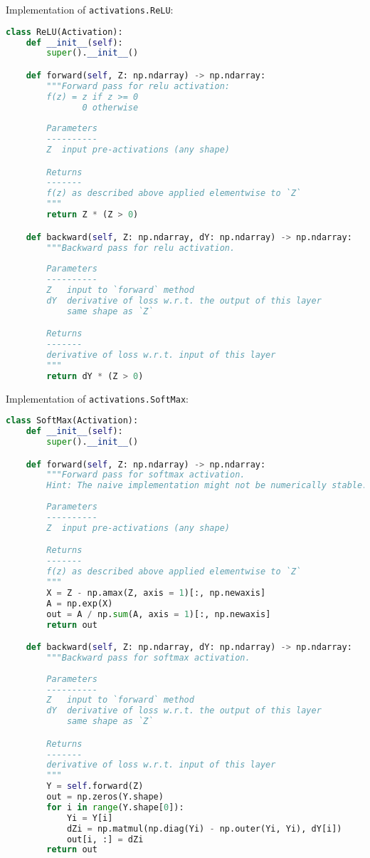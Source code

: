 Implementation of \texttt{activations.ReLU}:

\begin{lstlisting}[language=Python]
class ReLU(Activation):
    def __init__(self):
        super().__init__()

    def forward(self, Z: np.ndarray) -> np.ndarray:
        """Forward pass for relu activation:
        f(z) = z if z >= 0
               0 otherwise
        
        Parameters
        ----------
        Z  input pre-activations (any shape)

        Returns
        -------
        f(z) as described above applied elementwise to `Z`
        """
        return Z * (Z > 0)

    def backward(self, Z: np.ndarray, dY: np.ndarray) -> np.ndarray:
        """Backward pass for relu activation.
        
        Parameters
        ----------
        Z   input to `forward` method
        dY  derivative of loss w.r.t. the output of this layer
            same shape as `Z`

        Returns
        -------
        derivative of loss w.r.t. input of this layer
        """
        return dY * (Z > 0)

\end{lstlisting}

Implementation of \texttt{activations.SoftMax}:

\begin{lstlisting}[language=Python]
class SoftMax(Activation):
    def __init__(self):
        super().__init__()

    def forward(self, Z: np.ndarray) -> np.ndarray:
        """Forward pass for softmax activation.
        Hint: The naive implementation might not be numerically stable.
        
        Parameters
        ----------
        Z  input pre-activations (any shape)

        Returns
        -------
        f(z) as described above applied elementwise to `Z`
        """
        X = Z - np.amax(Z, axis = 1)[:, np.newaxis]
        A = np.exp(X)
        out = A / np.sum(A, axis = 1)[:, np.newaxis]
        return out

    def backward(self, Z: np.ndarray, dY: np.ndarray) -> np.ndarray:
        """Backward pass for softmax activation.
        
        Parameters
        ----------
        Z   input to `forward` method
        dY  derivative of loss w.r.t. the output of this layer
            same shape as `Z`

        Returns
        -------
        derivative of loss w.r.t. input of this layer
        """
        Y = self.forward(Z)
        out = np.zeros(Y.shape)
        for i in range(Y.shape[0]):
            Yi = Y[i]
            dZi = np.matmul(np.diag(Yi) - np.outer(Yi, Yi), dY[i])
            out[i, :] = dZi
        return out

\end{lstlisting}


